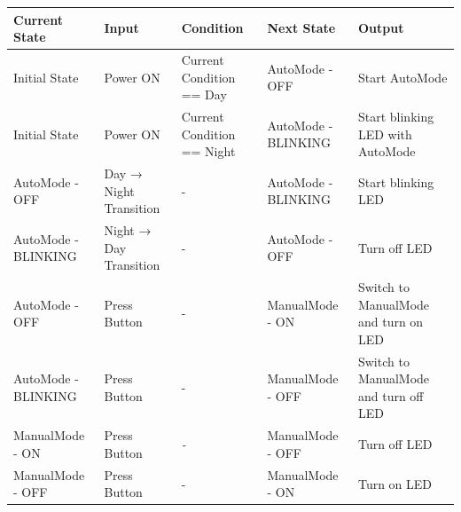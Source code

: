 \begin{table}[H]
\centering
\small
\begin{tabular}{|p{2.3cm}|p{3cm}|p{4cm}|p{2cm}|p{4cm}|}
\hline

\textbf{Current State} & \textbf{Input} & \textbf{Condition} & \textbf{Next State} & \textbf{Output} \\ \hline
{Initial State}                                & {Power ON}                            & {Current Condition == Day}                & {AutoMode - OFF}                           & Start AutoMode                            \\ \hline
{Initial State}                                & {Power ON}                            & {Current Condition == Night}              & {AutoMode - BLINKING}                      & Start blinking LED with AutoMode          \\ \hline
{AutoMode - OFF}                               & {Day → Night Transition}              & {-}                                       & {AutoMode - BLINKING}                      & Start blinking LED                        \\ \hline
{AutoMode - BLINKING}                          & {Night → Day Transition}              & {-}                                       & {AutoMode -  OFF}                          & Turn off LED                              \\ \hline
{AutoMode - OFF}                               & {Press Button}                        & {-}                                       & {ManualMode - ON}                          & Switch to ManualMode and turn on LED      \\ \hline
AutoMode - BLINKING                                                 & Press Button                                               & -                                                              & ManualMode - OFF                                                & Switch to ManualMode and turn off LED     \\ \hline
ManualMode - ON                                                     & Press Button                                               & \textit{-}                                                     & ManualMode - OFF                                                & Turn off LED                              \\ \hline
ManualMode - OFF                                                    & Press Button                                               & -                                                              & ManualMode - ON                                                 & Turn on LED                               \\ \hline

\end{tabular}
\end{table}
